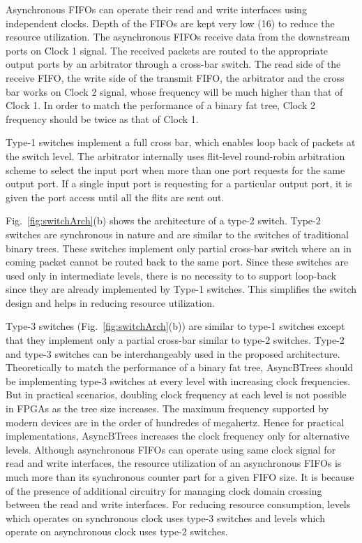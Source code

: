 Asynchronous FIFOs can operate their read and write interfaces using independent clocks.
Depth of the FIFOs are kept very low (16) to reduce the resource utilization.
The asynchronous FIFOs receive data from the downstream ports on Clock 1 signal.
The received packets are routed to the appropriate output ports by an arbitrator through a cross-bar switch.
The read side of the receive FIFO, the write side of the transmit FIFO, the arbitrator and the cross bar works on Clock 2 signal, whose frequency will be much higher than that of Clock 1.
In order to match the performance of a binary fat tree, Clock 2 frequency should be twice as that of Clock 1.

Type-1 switches implement a full cross bar, which enables loop back of packets at the switch level.
The arbitrator internally uses flit-level round-robin arbitration scheme to select the input port when more than one port requests for the same output port.
If a single input port is requesting for a particular output port, it is given the port access until all the flits are sent out.

Fig.~\ref{fig:switchArch}(b) shows the architecture of a type-2 switch.
Type-2 switches are synchronous in nature and are similar to the switches of traditional binary trees.
These switches implement only partial cross-bar switch where an in coming packet cannot be routed back to the same port.
Since these switches are used only in intermediate levels, there is no necessity to to support loop-back since they are already implemented by Type-1 switches.
This simplifies the switch design and helps in reducing resource utilization.

Type-3 switches (Fig.~\ref{fig:switchArch}(b)) are similar to type-1 switches except that they implement only a partial cross-bar similar to type-2 switches.
Type-2 and type-3 switches can be interchangeably used in the proposed architecture. 
Theoretically to match the performance of a binary fat tree, AsyncBTrees should be implementing type-3 switches at every level with increasing clock frequencies.
But in practical scenarios, doubling clock frequency at each level is not possible in FPGAs as the tree size increases.
The maximum frequency supported by modern devices are in the order of hundredes of megahertz.
Hence for practical implementations, AsyncBTrees increases the clock frequency only for alternative levels. 
Although asynchronous FIFOs can operate using same clock signal for read and write interfaces, the resource utilization of an asynchronous FIFOs is much more than its synchronous counter part for a given FIFO size.
It is because of the presence of additional circuitry for managing clock domain crossing between the read and write interfaces.
For reducing resource consumption, levels which operates on synchronous clock uses type-3 switches and levels which operate on asynchronous clock uses type-2 switches.

